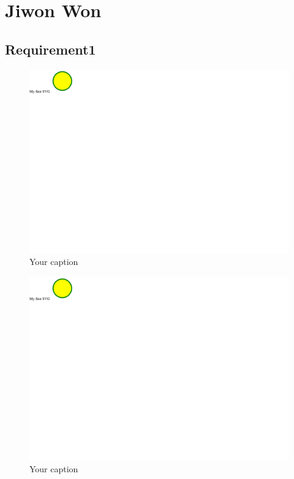 \documentclass{article}
\begin{document}
\section{Jiwon Won}
	\subsection{Requirement1}
		\begin{figure}[h!]
		    \centering
		    \captionsetup{labelformat=empty}
		    \caption{Your caption}
		    \includegraphics[width=\textwidth, angle=0]{Kreis2.pdf}
		\end{figure}
		\newpage
		\begin{figure}[h!]
		    \centering
		    \captionsetup{labelformat=empty}
		    \caption{Your caption}
		    \includegraphics[width=\textwidth, angle=0]{Kreis2.pdf}
		\end{figure}
		\newpage
\end{document}
